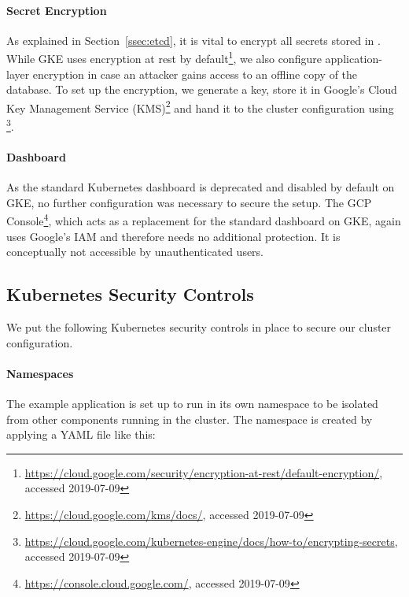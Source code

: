\paragraph{Secret Encryption}

As explained in Section~\ref{ssec:etcd}, it is vital to encrypt all secrets stored in . While \ac{GKE} uses encryption at rest by default\footnote{\url{https://cloud.google.com/security/encryption-at-rest/default-encryption/}, accessed 2019-07-09}, we also configure application-layer encryption in case an attacker gains access to an offline copy of the  database. To set up the encryption, we generate a key, store it in Google's Cloud Key Management Service (KMS)\footnote{\url{https://cloud.google.com/kms/docs/}, accessed 2019-07-09} and hand it to the cluster configuration using \footnote{\url{https://cloud.google.com/kubernetes-engine/docs/how-to/encrypting-secrets}, accessed 2019-07-09}.  

\paragraph{Dashboard}

As the standard Kubernetes dashboard is deprecated and disabled by default on \ac{GKE}, no further configuration was necessary to secure the setup. The \ac{GCP} Console\footnote{\url{https://console.cloud.google.com/}, accessed 2019-07-09}, which acts as a replacement for the standard dashboard on \ac{GKE}, again uses Google's \ac{IAM} and therefore needs no additional protection. It is conceptually not accessible by unauthenticated users. 

\subsection{Kubernetes Security Controls} \label{ssec:exaLayer3}

We put the following Kubernetes security controls in place to secure our cluster configuration.

\paragraph{Namespaces}

The example application is set up to run in its own namespace  to be isolated from other components running in the cluster. The namespace is created by applying a YAML file like this:

